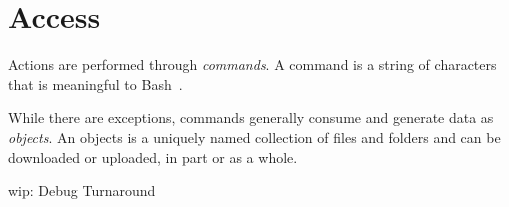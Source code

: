 \section{Access}

Actions are performed through \emph{commands}. A command is a string of characters that is meaningful to Bash~\cite{gnu_bash}. 

While there are exceptions, commands generally consume and generate data as \emph{objects}. An objects is a uniquely named collection of files and folders and can be downloaded or uploaded, in part or as a whole.



wip: Debug Turnaround